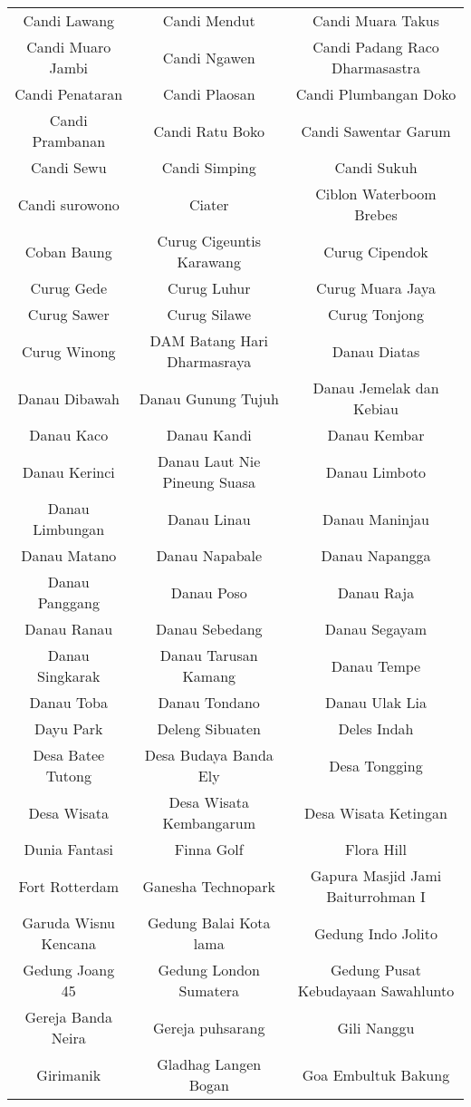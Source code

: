 \begin{table}[H]
\begin{tabular}{ c | c | c }
Candi Lawang & Candi Mendut & Candi Muara Takus\\
Candi Muaro Jambi & Candi Ngawen & Candi Padang Raco Dharmasastra\\
Candi Penataran & Candi Plaosan & Candi Plumbangan Doko\\
Candi Prambanan & Candi Ratu Boko & Candi Sawentar Garum\\
Candi Sewu & Candi Simping & Candi Sukuh\\
Candi surowono & Ciater & Ciblon Waterboom Brebes\\
Coban Baung & Curug Cigeuntis Karawang & Curug Cipendok\\
Curug Gede & Curug Luhur & Curug Muara Jaya\\
Curug Sawer & Curug Silawe & Curug Tonjong\\
Curug Winong & DAM Batang Hari Dharmasraya & Danau Diatas\\
Danau Dibawah & Danau Gunung Tujuh & Danau Jemelak dan Kebiau\\
Danau Kaco & Danau Kandi & Danau Kembar\\
Danau Kerinci & Danau Laut Nie Pineung Suasa & Danau Limboto\\
Danau Limbungan & Danau Linau & Danau Maninjau\\
Danau Matano & Danau Napabale & Danau Napangga\\
Danau Panggang & Danau Poso & Danau Raja\\
Danau Ranau & Danau Sebedang & Danau Segayam\\
Danau Singkarak & Danau Tarusan Kamang & Danau Tempe\\
Danau Toba & Danau Tondano & Danau Ulak Lia\\
Dayu Park & Deleng Sibuaten & Deles Indah\\
Desa Batee Tutong & Desa Budaya Banda Ely & Desa Tongging\\
Desa Wisata & Desa Wisata Kembangarum & Desa Wisata Ketingan\\
Dunia Fantasi & Finna Golf & Flora Hill\\
Fort Rotterdam & Ganesha Technopark & Gapura Masjid Jami Baiturrohman I\\
Garuda Wisnu Kencana & Gedung Balai Kota lama & Gedung Indo Jolito\\
Gedung Joang 45 & Gedung London Sumatera & Gedung Pusat Kebudayaan Sawahlunto\\
Gereja Banda Neira & Gereja puhsarang & Gili Nanggu\\
Girimanik & Gladhag Langen Bogan & Goa Embultuk Bakung\\

\end{tabular}
\end{table}
